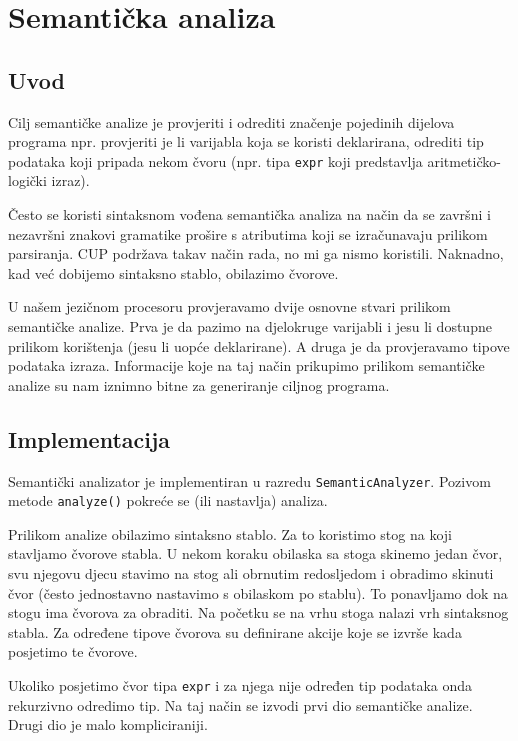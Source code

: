 \chapter{Semantička analiza}

\section{Uvod}

Cilj semantičke analize je provjeriti i odrediti značenje pojedinih dijelova programa npr. provjeriti
je li varijabla koja se koristi deklarirana, odrediti tip podataka koji pripada nekom čvoru (npr. tipa \texttt{expr}
koji predstavlja aritmetičko-logički izraz).

Često se koristi sintaksnom vođena semantička analiza na način da se završni i nezavršni znakovi gramatike
prošire s atributima koji se izračunavaju prilikom parsiranja. CUP podržava takav način rada, no
mi ga nismo koristili. Naknadno, kad već dobijemo sintaksno stablo, obilazimo čvorove.

U našem jezičnom procesoru provjeravamo dvije osnovne stvari prilikom semantičke analize. Prva je da pazimo
na djelokruge varijabli i jesu li dostupne prilikom korištenja (jesu li uopće deklarirane). A druga je
da provjeravamo tipove podataka izraza. Informacije koje na taj način prikupimo prilikom semantičke
analize su nam iznimno bitne za generiranje ciljnog programa.


\section{Implementacija}
Semantički analizator je implementiran u razredu \texttt{SemanticAnalyzer}. Pozivom metode \texttt{analyze()}
pokreće se (ili nastavlja) analiza.

Prilikom analize obilazimo sintaksno stablo. Za to koristimo stog na koji stavljamo čvorove stabla.
U nekom koraku obilaska sa stoga skinemo jedan čvor, svu njegovu djecu stavimo na stog ali obrnutim redosljedom i 
obradimo skinuti čvor (često jednostavno nastavimo s obilaskom po stablu). To ponavljamo dok na stogu ima čvorova za obraditi. 
Na početku se na vrhu stoga nalazi vrh sintaksnog stabla.
Za određene tipove čvorova su definirane akcije koje se izvrše kada posjetimo te čvorove. 

Ukoliko posjetimo čvor tipa \texttt{expr} i za njega nije određen tip podataka onda rekurzivno 
odredimo tip. Na taj način se izvodi prvi dio semantičke analize. Drugi dio je malo kompliciraniji.


